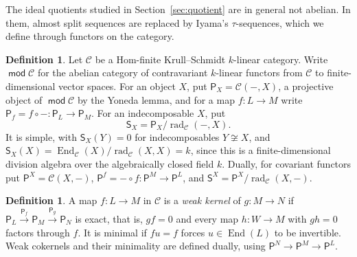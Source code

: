 \documentclass[a4paper,reqno,10pt]{amsart}
\theoremstyle{definition}
\newtheorem{definition}[theorem]{Definition}
\numberwithin{equation}{section}
\DeclareMathOperator{\moduleCategory}{\mathsf{mod}}
\renewcommand{\mod}{\moduleCategory}
\DeclareMathOperator{\End}{End}
\DeclareMathOperator{\rad}{rad}
\newcommand{\cC}{\mathcal C}
\begin{document}
The ideal quotients studied in Section~\ref{sec:quotient} are in general
not abelian. In them, almost split sequences are replaced by Iyama's
\(\tau\)-sequences, which we define through functors on the category.
\begin{definition}\label{def:simple-functors}
Let \(\cC\) be a Hom-finite Krull--Schmidt \(k\)-linear category. Write
\(\mod\cC\) for the abelian category of contravariant \(k\)-linear functors
from \(\cC\) to finite-dimensional vector spaces. For an object \(X\), put
\(\mathsf P_X=\cC(-,X)\), a projective object of \(\mod\cC\) by the Yoneda
lemma, and for a map \(f:L\to M\) write
\(\mathsf P_f=f\circ-:\mathsf P_L\to\mathsf P_M\). For an indecomposable
\(X\), put
\[
 \mathsf S_X=\mathsf P_X/\rad_{\cC}(-,X).
\]
It is simple, with \(\mathsf S_X(Y)=0\) for indecomposables \(Y\not\cong X\),
and \(\mathsf S_X(X)=\End_{\cC}(X)/\rad_{\cC}(X,X)=k\), since this is a
finite-dimensional division algebra over the algebraically closed field
\(k\).
Dually, for covariant functors put \(\mathsf P^X=\cC(X,-)\),
\(\mathsf P^f=-\circ f:\mathsf P^M\to\mathsf P^L\), and
\(\mathsf S^X=\mathsf P^X/\rad_{\cC}(X,-)\).
\end{definition}

\begin{definition}\label{def:weak-kernel}
A map \(f:L\to M\) in \(\cC\) is a \emph{weak kernel} of \(g:M\to N\) if
\(\mathsf P_L\xrightarrow{\mathsf P_f}\mathsf P_M\xrightarrow{\mathsf P_g}\mathsf P_N\)
is exact, that is, \(gf=0\) and every map \(h:W\to M\) with \(gh=0\)
factors through \(f\). It is minimal if \(fu=f\) forces \(u\in\End(L)\)
to be invertible. Weak cokernels and their minimality are defined dually,
using \(\mathsf P^N\to\mathsf P^M\to\mathsf P^L\).
\end{definition}
\end{document}
